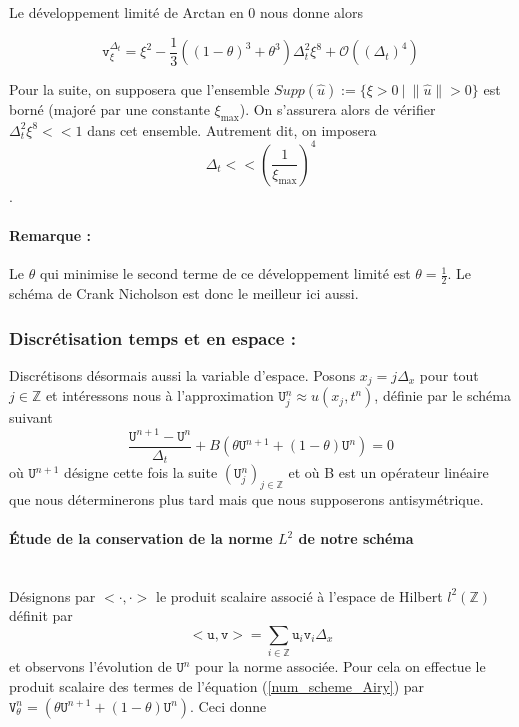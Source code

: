 \documentclass[12pt,a4paper]{article}
\numberwithin{equation}{section}
\begin{document}
Le développement limité de Arctan en 0 nous donne alors

\begin{equation}
    \texttt{v}_\xi^{\Delta_t} = \xi^2 - \frac{1}{3}\left((1-\theta)^3+\theta^3\right)\Delta_t^2\xi^8 + \mathcal{O}((\Delta_t)^4) 
\end{equation}

Pour la suite, on supposera que l'ensemble $Supp(\hat{u}):=\{\xi > 0 ~|~ \|\hat{u}\|>0\}$ est borné (majoré par une constante $\xi_\text{max}$). On s'assurera alors de vérifier $\Delta_t^2\xi^8 << 1$ dans cet ensemble. Autrement dit, on imposera $$\Delta_t << \left(\frac{1}{\xi_\text{max}}\right)^4$$.
\paragraph{Remarque :} Le $\theta$ qui minimise le second terme de ce développement limité est $\theta = \frac{1}{2}$. Le schéma de Crank Nicholson est donc le meilleur ici aussi.

\subsubsection{Discrétisation temps et en espace :}
Discrétisons désormais aussi la variable d'espace. Posons $x_j = j\Delta_x$ pour tout $j\in\mathbb{Z}$ et intéressons nous à l'approximation $\texttt{U}^n_j \approx u(x_j,t^n)$, définie par le schéma suivant
\begin{equation}
\frac{\texttt{U}^{n+1}-\texttt{U}^n}{\Delta_t} + B(\theta\texttt{U}^{n+1} + (1-\theta)\texttt{U}^{n}) = 0 \label{num_scheme_Airy}
\end{equation}
où $\texttt{U}^{n+1}$ désigne cette fois la suite $(\texttt{U}^n_j)_{j\in\mathbb{Z}}$ et où B est un opérateur linéaire que nous déterminerons plus tard mais que nous supposerons antisymétrique.\\

\paragraph{Étude de la conservation de la norme $L^2$ de notre schéma}\,\\

Désignons par $<\cdot,\cdot>$ le produit scalaire associé à l'espace de Hilbert $l^2(\mathbb{Z})$ définit par $$<\texttt{u},\texttt{v} > = \sum\limits_{i\in\mathbb{Z}}\texttt{u}_i\texttt{v}_i\Delta_x$$ et observons l'évolution de $\texttt{U}^n$ pour la norme associée. Pour cela on effectue le produit scalaire des termes de l'équation (\ref{num_scheme_Airy}) par $ \texttt{V}^n_\theta = (\theta\texttt{U}^{n+1} + (1-\theta)\texttt{U}^{n})$. Ceci donne
\end{document}
